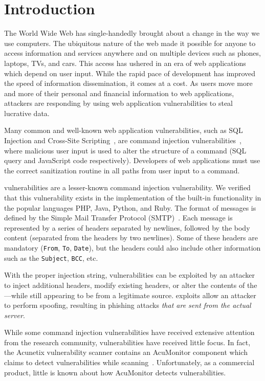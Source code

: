 \section{Introduction}\label{sec:Introduction}
The World Wide Web has single-handedly brought about a change in the way we use computers. The ubiquitous nature of the web made it possible for anyone to access information and services anywhere and on multiple devices such as phones, laptops, TVs, and cars. This access has ushered in an era of web applications which depend on user input. 
While the rapid pace of development has improved the speed of
information dissemination, it comes at a cost. As users move more and
more of their personal and financial information to web applications,
attackers are responding by using web application vulnerabilities to steal lucrative data.

Many common and well-known web application vulnerabilities, such as SQL Injection and Cross-Site Scripting~\cite{OWASPT10}, are command injection vulnerabilities~\cite{commandinjection}, where malicious user input is used to alter the structure of a command (SQL query and JavaScript code respectively). Developers of web applications must use the correct sanitization routine in all paths from user input to a command. 

\ehi vulnerabilities are a lesser-known command injection vulnerability. We verified that this vulnerability exists in the implementation of the built-in \email functionality in the popular languages PHP, Java, Python, and Ruby. The format of \email messages is defined by the Simple Mail Transfer Protocol (SMTP)~\cite{rfc5322}. Each \email message is represented by a series of headers separated by newlines, followed by the body content (separated from the headers by two newlines). Some of these headers are mandatory (\texttt{From}, \texttt{To}, \texttt{Date}), but the headers could also include other information such as the \texttt{Subject}, \texttt{BCC}, etc.

With the proper injection string, \ehi vulnerabilities can be exploited by an attacker to inject additional headers, modify existing headers, or alter the contents of the \email---while still appearing to be from a legitimate source. \ehi exploits allow an attacker to perform \email spoofing, resulting in phishing attacks \emph{that are sent from the actual \email server}.

While some command injection vulnerabilities have received extensive attention from the research community, \ehi vulnerabilities have received little focus. In fact, the Acunetix vulnerability scanner contains an AcuMonitor component which claims to detect \ehi vulnerabilities while scanning~\cite{acumonitor}. Unfortunately, as a commercial product, little is known about how AcuMonitor detects \ehi vulnerabilities. 

